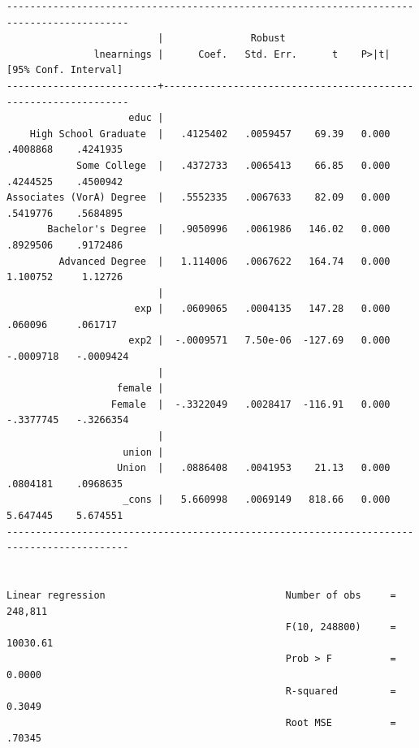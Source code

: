 \documentclass[
]{book}
\begin{document}
\begin{verbatim}
-------------------------------------------------------------------------------------------
                          |               Robust
               lnearnings |      Coef.   Std. Err.      t    P>|t|     [95% Conf. Interval]
--------------------------+----------------------------------------------------------------
                     educ |
    High School Graduate  |   .4125402   .0059457    69.39   0.000     .4008868    .4241935
            Some College  |   .4372733   .0065413    66.85   0.000     .4244525    .4500942
Associates (VorA) Degree  |   .5552335   .0067633    82.09   0.000     .5419776    .5684895
       Bachelor's Degree  |   .9050996   .0061986   146.02   0.000     .8929506    .9172486
         Advanced Degree  |   1.114006   .0067622   164.74   0.000     1.100752     1.12726
                          |
                      exp |   .0609065   .0004135   147.28   0.000      .060096     .061717
                     exp2 |  -.0009571   7.50e-06  -127.69   0.000    -.0009718   -.0009424
                          |
                   female |
                  Female  |  -.3322049   .0028417  -116.91   0.000    -.3377745   -.3266354
                          |
                    union |
                   Union  |   .0886408   .0041953    21.13   0.000     .0804181    .0968635
                    _cons |   5.660998   .0069149   818.66   0.000     5.647445    5.674551
-------------------------------------------------------------------------------------------


Linear regression                               Number of obs     =    248,811
                                                F(10, 248800)     =   10030.61
                                                Prob > F          =     0.0000
                                                R-squared         =     0.3049
                                                Root MSE          =     .70345


\end{verbatim}
\end{document}
